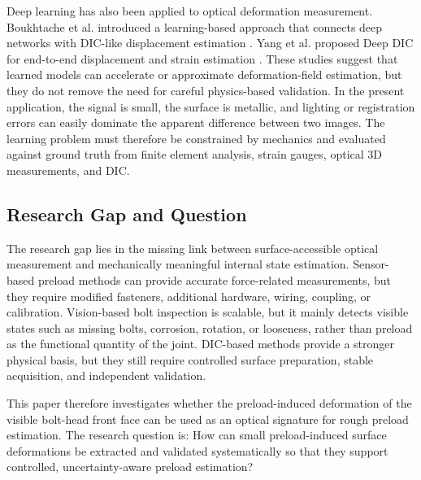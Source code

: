 Deep learning has also been applied to optical deformation measurement\cite{afifi2025data}. Boukhtache et al. introduced a learning-based approach that connects deep networks with DIC-like displacement estimation \cite{boukhtache2021strainnet}. Yang et al. proposed Deep DIC for end-to-end displacement and strain estimation \cite{yang2022deepdic}. These studies suggest that learned models can accelerate or approximate deformation-field estimation, but they do not remove the need for careful physics-based validation. In the present application, the signal is small, the surface is metallic, and lighting or registration errors can easily dominate the apparent difference between two images. The learning problem must therefore be constrained by mechanics and evaluated against ground truth from finite element analysis, strain gauges, optical 3D measurements, and DIC.

\subsection{Research Gap and Question}
The research gap lies in the missing link between surface-accessible optical measurement and mechanically meaningful internal state estimation. Sensor-based preload methods can provide accurate force-related measurements, but they require modified fasteners, additional hardware, wiring, coupling, or calibration. Vision-based bolt inspection is scalable, but it mainly detects visible states such as missing bolts, corrosion, rotation, or looseness, rather than preload as the functional quantity of the joint. DIC-based methods provide a stronger physical basis, but they still require controlled surface preparation, stable acquisition, and independent validation.

This paper therefore investigates whether the preload-induced deformation of the visible bolt-head front face can be used as an optical signature for rough preload estimation. The research question is: How can small preload-induced surface deformations be extracted and validated systematically so that they support controlled, uncertainty-aware preload estimation?

